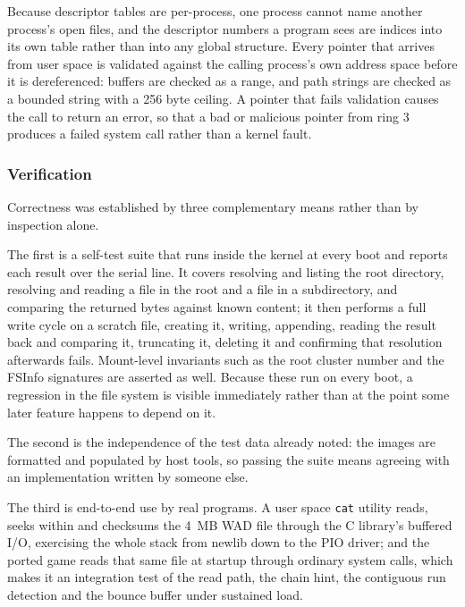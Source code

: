 Because descriptor tables are per-process, one process cannot name another
process's open files, and the descriptor numbers a program sees are indices
into its own table rather than into any global structure. Every pointer that
arrives from user space is validated against the calling process's own address
space before it is dereferenced: buffers are checked as a range, and path
strings are checked as a bounded string with a 256 byte ceiling. A pointer that
fails validation causes the call to return an error, so that a bad or malicious
pointer from ring 3 produces a failed system call rather than a kernel fault.

\subsubsection{Verification}

Correctness was established by three complementary means rather than by
inspection alone.

The first is a self-test suite that runs inside the kernel at every boot and
reports each result over the serial line. It covers resolving and listing the
root directory, resolving and reading a file in the root and a file in a
subdirectory, and comparing the returned bytes against known content; it then
performs a full write cycle on a scratch file, creating it, writing, appending,
reading the result back and comparing it, truncating it, deleting it and
confirming that resolution afterwards fails. Mount-level invariants such as the
root cluster number and the FSInfo signatures are asserted as well. Because
these run on every boot, a regression in the file system is visible immediately
rather than at the point some later feature happens to depend on it.

The second is the independence of the test data already noted: the images are
formatted and populated by host tools, so passing the suite means agreeing with
an implementation written by someone else.

The third is end-to-end use by real programs. A user space \texttt{cat} utility
reads, seeks within and checksums the 4~MB WAD file through the C library's
buffered I/O, exercising the whole stack from newlib down to the PIO driver;
and the ported game reads that same file at startup through ordinary system
calls, which makes it an integration test of the read path, the chain hint, the
contiguous run detection and the bounce buffer under sustained load.
